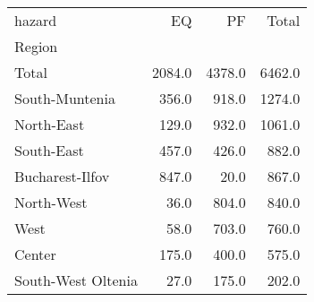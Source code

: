 \begin{tabular}{lrrr}
\toprule
hazard &      EQ &      PF &   Total \\
Region             &         &         &         \\
\midrule
Total              &  2084.0 &  4378.0 &  6462.0 \\
South-Muntenia     &   356.0 &   918.0 &  1274.0 \\
North-East         &   129.0 &   932.0 &  1061.0 \\
South-East         &   457.0 &   426.0 &   882.0 \\
Bucharest-Ilfov    &   847.0 &    20.0 &   867.0 \\
North-West         &    36.0 &   804.0 &   840.0 \\
West               &    58.0 &   703.0 &   760.0 \\
Center             &   175.0 &   400.0 &   575.0 \\
South-West Oltenia &    27.0 &   175.0 &   202.0 \\
\bottomrule
\end{tabular}
